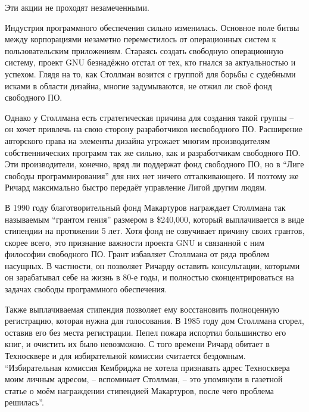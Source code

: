 Эти акции не проходят незамеченными. 

Индустрия программного обеспечения сильно изменилась. Основное поле битвы между корпорациями незаметно переместилось от операционных систем к пользовательским приложениям. Стараясь создать свободную операционную систему, проект GNU безнадёжно отстал от тех, кто гнался за актуальностью и успехом. Глядя на то, как Столлман возится с группой для борьбы с судебными исками в области дизайна, многие задумываются, не отжил ли своё фонд свободного ПО.

Однако у Столлмана есть стратегическая причина для создания такой группы -- он хочет привлечь на свою сторону разработчиков несвободного ПО. Расширение авторского права на элементы дизайна угрожает многим производителям собственнических программ так же сильно, как и разработчикам свободного ПО. Эти производители, конечно, вряд ли поддержат фонд свободного ПО, но в \enquote{Лиге свободы программирования} для них нет ничего отталкивающего. И поэтому же Ричард максимально быстро передаёт управление Лигой другим людям.

В 1990 году благотворительный фонд Макартуров награждает Столлмана так называемым \enquote{грантом гения} размером в \$240,000, который выплачивается в виде стипендии на протяжении 5 лет. Хотя фонд не озвучивает причину своих грантов, скорее всего, это признание важности проекта GNU и связанной с ним философии свободного ПО. Грант избавляет Столлмана от ряда проблем насущных. В частности, он позволяет Ричарду оставить консультации, которыми он зарабатывал себе на жизнь в 80-е годы, и полностью сконцентрироваться на задачах свободы программного обеспечения.

Также выплачиваемая стипендия позволяет ему восстановить полноценную регистрацию, которая нужна для голосования. В 1985 году дом Столлмана сгорел, оставив его без места регистрации. Пепел пожара испортил большинство его книг, и очистить их было невозможно. С того времени Ричард обитает в Техносквере и для избирательной комиссии считается бездомным. \enquote{Избирательная комиссия Кембриджа не хотела признавать адрес Техносквера моим личным адресом, -- вспоминает Столлман, -- это упомянули в газетной статье о моём награждении стипендией Макартуров, после чего проблема решилась}.

